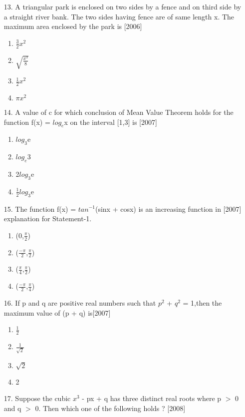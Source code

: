 \documentclass[journal,12pt,twocolumn]{IEEEtran}
\theoremstyle{remark}
\begin{document}
\begin{enumerate}
\begin{enumerate}
        \end{enumerate}
        \item[13.] A triangular park is enclosed on two sides by a fence and on third side by a straight river bank. The two sides having fence are of same length x. The maximum area enclosed by the park is \hfill[2006]
        \begin{enumerate}
            \item $\frac{3}{2}$$x^2$
        \item $\sqrt{\frac{x^3}{8}}$
        \item $\frac{1}{2}$$x^2$
        \item $\pi$$x^2$
        \end{enumerate}
        \item[14.] A value of c for which conclusion of Mean Value Theorem holds for the function f(x) = $log_e$x on the interval [1,3] is \hfill[2007]
        \begin{enumerate}
            \item $log_3$e
        \item $log_e$3
        \item 2$log_3$e
        \item $\frac{1}{2}$$log_3$e
        \end{enumerate}
        \item[15.] The function f(x) = $tan^{-1}$(sinx + cosx) is an increasing function in \hfill[2007]
        explanation for Statement-1.\begin{enumerate}
      \item (0,$\frac{\pi}{2}$)
        \item ($\frac{-\pi}{2}$,$\frac{\pi}{2}$)
        \item ($\frac{\pi}{4}$,$\frac{\pi}{2}$)
        \item ($\frac{-\pi}{2}$,$\frac{\pi}{4}$)
        \end{enumerate}
        \item[16.] If p and q are positive real numbers such that $p^2$ + $q^2$ = 1,then the maximum value of (p + q) is\hfill[2007]
        \begin{enumerate}
        \item $\frac{1}{2}$
        \item $\frac{1}{\sqrt{2}}$
        \item $\sqrt{2}$
        \item 2
        \end{enumerate}
        \item[17.] Suppose the cubic $x^3$ - px + q has three distinct real roots where p $>$ 0 and q $>$ 0. Then which one of the following holds ? \hfill[2008]

\end{enumerate}
\end{document}
